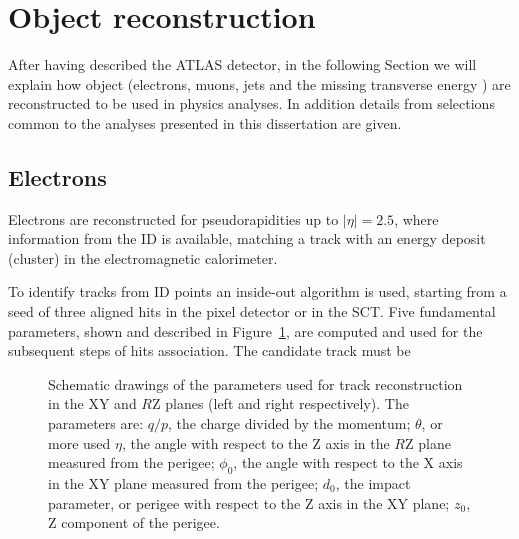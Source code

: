 
\section{Object reconstruction}\label{chap:objects}

After having described the ATLAS detector, in the following Section we will
explain how object (electrons, muons, jets and the missing transverse energy \met) 
are reconstructed to be used in physics analyses. In addition details from
selections common to the analyses presented in this dissertation are given.


\subsection{Electrons}\label{sec:electrons}
Electrons are reconstructed for pseudorapidities up to $|\eta| = 2.5$, where
information from the ID is available, matching a track with an energy deposit
(cluster) in the electromagnetic calorimeter. 

To identify tracks from ID points an inside-out algorithm is used, starting from a 
seed of three aligned hits in the pixel detector or in the SCT. Five fundamental parameters,
shown and described in Figure~\ref{fig:trackpar}, are computed and used for the subsequent 
steps of hits association. The candidate track must be 

\begin{figure}[tb]\begin{center}
	\caption{Schematic drawings of the parameters used for track reconstruction in the XY and $R$Z planes (left and right respectively).
          The parameters are: $q/p$, the charge divided by the momentum; $\theta$, or more used $\eta$, the angle
          with respect to the Z axis in the $R$Z plane measured from the perigee; $\phi_0$, the angle 
          with respect to the X axis in the XY plane measured from the perigee; $d_0$, the impact parameter, 
          or perigee with respect to the Z axis in the XY plane; $z_0$, Z component of the perigee.\label{fig:trackpar}}
\end{center}\end{figure}


